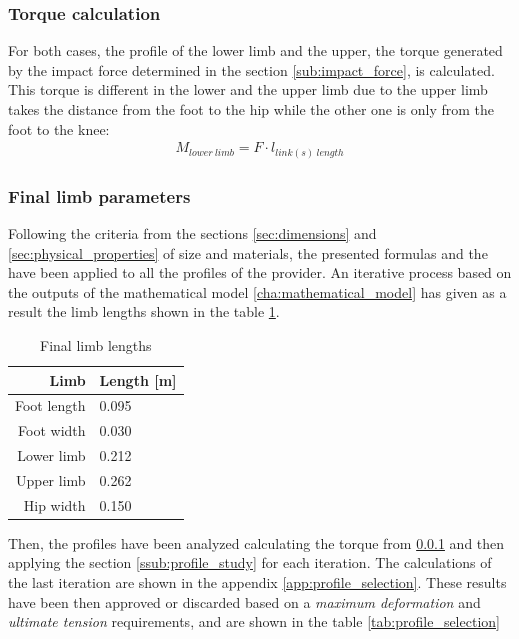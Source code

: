 \subsubsection{Torque calculation} %
\label{ssub:torque_calculation}
  For both cases, the profile of the lower limb and the upper, the torque generated by the impact force determined in the section \ref{sub:impact_force}, is calculated.
  This torque is different in the lower and the upper limb due to the upper limb takes the distance from the foot to the hip while the other one is only from the foot to the knee:
  \begin{equation}
  \begin{aligned}
     M_{lower\ limb} = F \cdot l_{link(s)\ length}
  \end{aligned}
  \end{equation}

\subsubsection{Final limb parameters} %
\label{ssub:final_limb_parameters}
Following the criteria from the sections \ref{sec:dimensions} and \ref{sec:physical_properties} of size and materials, the presented formulas and the have been applied to all the profiles of the provider.
An iterative process based on the outputs of the mathematical model \ref{cha:mathematical_model} has given as a result the limb lengths shown in the table \ref{tab:limb_lengths}.

\begin{table}[ht!]
\centering
\caption{Final limb lengths}
\label{tab:limb_lengths}
\begin{tabular}{r|l}
  \textbf{Limb} & \textbf{Length [m]} \\ \hline
  Foot length & 0.095 \\ \hline
  Foot width & 0.030 \\ \hline
  Lower limb & 0.212 \\ \hline
  Upper limb & 0.262 \\ \hline
  Hip width & 0.150     
\end{tabular}
\end{table}

Then, the profiles have been analyzed calculating the torque from \ref{ssub:torque_calculation} and then applying the section \ref{ssub:profile_study} for each iteration.
The calculations of the last iteration are shown in the appendix \ref{app:profile_selection}.
These results have been then approved or discarded based on a \textit{maximum deformation} and \textit{ultimate tension} requirements, and are shown in the table \ref{tab:profile_selection}

